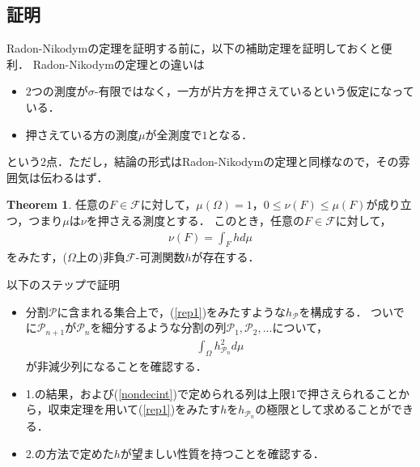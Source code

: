 \documentclass[a4paper,10pt]{jsarticle}
\theoremstyle{definition}
\newtheorem{theorem}{Theorem}
\newcommand{\eq}[1]{\begin{align}#1\end{align}}
\newcommand{\items}[1]{\begin{itemize}#1\end{itemize}}
\begin{document}
\subsection*{証明}
Radon-Nikodymの定理を証明する前に，以下の補助定理を証明しておくと便利．
Radon-Nikodymの定理との違いは
\items{
	\item $2$つの測度が$\sigma$-有限ではなく，一方が片方を押さえているという仮定になっている．
	\item 押さえている方の測度$\mu$が全測度で$1$となる．}
という$2$点．ただし，結論の形式はRadon-Nikodymの定理と同様なので，その雰囲気は伝わるはず．
\begin{theorem}
任意の$F\in\mathcal{F}$に対して，$\mu(\Omega)=1$，$0\le\nu(F)\le\mu(F)$が成り立つ，つまり$\mu$は$\nu$を押さえる測度とする．
このとき，任意の$F\in\mathcal{F}$に対して，
\eq{\nu(F)=\int_Fhd\mu\label{rep1}}
をみたす，($\Omega$上の)非負$\mathcal{F}$-可測関数$h$が存在する．
\end{theorem}
以下のステップで証明
\items{
	\item 分割$\mathcal{P}$に含まれる集合上で，(\ref{rep1})をみたすような$h_{\mathcal{P}}$を構成する．
		ついでに$\mathcal{P}_{n+1}$が$\mathcal{P}_n$を細分するような分割の列$\mathcal{P}_1,\mathcal{P}_2,...$について，
		\eq{\int_\Omega h^2_{\mathcal{P}_n}d\mu\label{nondecint}}
		が非減少列になることを確認する．
	\item 1.の結果，および(\ref{nondecint})で定められる列は上限$1$で押さえられることから，収束定理を用いて(\ref{rep1})をみたす$h$を$h_{\mathcal{P}_n}$の極限として求めることができる．
	\item 2.の方法で定めた$h$が望ましい性質を持つことを確認する．}
\end{document}
